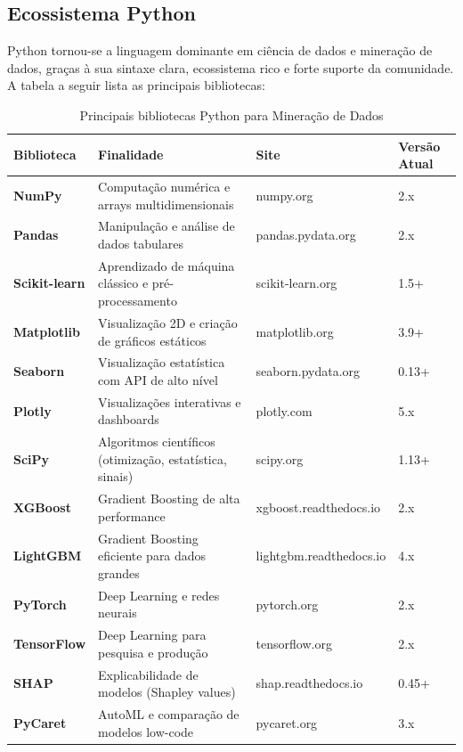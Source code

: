 \documentclass[12pt,a4paper]{article}
\begin{document}
\subsection{Ecossistema Python}

Python tornou-se a linguagem dominante em ciência de dados e mineração de dados, graças à sua sintaxe clara, ecossistema rico e forte suporte da comunidade. A tabela a seguir lista as principais bibliotecas:

\begin{table}[ht]
\centering
\caption{Principais bibliotecas Python para Mineração de Dados}
\label{tab:bibliotecas}
\small
\begin{tabular}{>{\bfseries}p{2.5cm} p{4.0cm} p{4.5cm} p{2.0cm}}
\toprule
\textbf{Biblioteca} & \textbf{Finalidade} & \textbf{Site} & \textbf{Versão Atual} \\
\midrule
NumPy & Computação numérica e arrays multidimensionais & numpy.org & 2.x \\
\midrule
Pandas & Manipulação e análise de dados tabulares & pandas.pydata.org & 2.x \\
\midrule
Scikit-learn & Aprendizado de máquina clássico e pré-processamento & scikit-learn.org & 1.5+ \\
\midrule
Matplotlib & Visualização 2D e criação de gráficos estáticos & matplotlib.org & 3.9+ \\
\midrule
Seaborn & Visualização estatística com API de alto nível & seaborn.pydata.org & 0.13+ \\
\midrule
Plotly & Visualizações interativas e dashboards & plotly.com & 5.x \\
\midrule
SciPy & Algoritmos científicos (otimização, estatística, sinais) & scipy.org & 1.13+ \\
\midrule
XGBoost & Gradient Boosting de alta performance & xgboost.readthedocs.io & 2.x \\
\midrule
LightGBM & Gradient Boosting eficiente para dados grandes & lightgbm.readthedocs.io & 4.x \\
\midrule
PyTorch & Deep Learning e redes neurais & pytorch.org & 2.x \\
\midrule
TensorFlow & Deep Learning para pesquisa e produção & tensorflow.org & 2.x \\
\midrule
SHAP & Explicabilidade de modelos (Shapley values) & shap.readthedocs.io & 0.45+ \\
\midrule
PyCaret & AutoML e comparação de modelos low-code & pycaret.org & 3.x \\
\bottomrule
\end{tabular}
\end{table}
\end{document}
